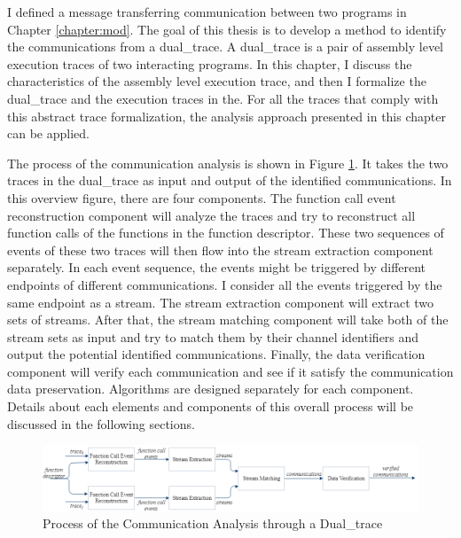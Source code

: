 


\label{chapter:alo}
I defined a message transferring communication between two programs in Chapter \ref{chapter:mod}. The goal of this thesis is to develop a method to identify the communications from a dual\_trace. A dual\_trace is a pair of assembly level execution traces of two interacting programs. In this chapter, I discuss the characteristics of the assembly level execution trace, and then I formalize the dual\_trace and the execution traces in the. For all the traces that comply with this abstract trace formalization, the analysis approach presented in this chapter can be applied.

The process of the communication analysis is shown in Figure \ref{overview}. It takes the two traces in the dual\_trace as input and output of the identified communications. In this overview figure, there are four components. The function call event reconstruction component will analyze the traces and try to reconstruct all function calls of the functions in the function descriptor. These two sequences of events of these two traces will then flow into the stream extraction component separately. In each event sequence, the events might be triggered by different endpoints of different communications. I consider all the events triggered by the same endpoint as a stream. The stream extraction component will extract two sets of streams. After that, the stream matching component will take both of the stream sets as input and try to match them by their channel identifiers and output the potential identified communications. Finally, the data verification component will verify each communication and see if it satisfy the communication data preservation. Algorithms are designed separately for each component. Details about each elements and components of this overall process will be discussed in the following sections.

\begin{figure}[H]
\centerline{\includegraphics[scale=0.55]{Figures/overview}}
\caption{Process of the Communication Analysis through a Dual\_trace}
\label{overview}
\end{figure}

